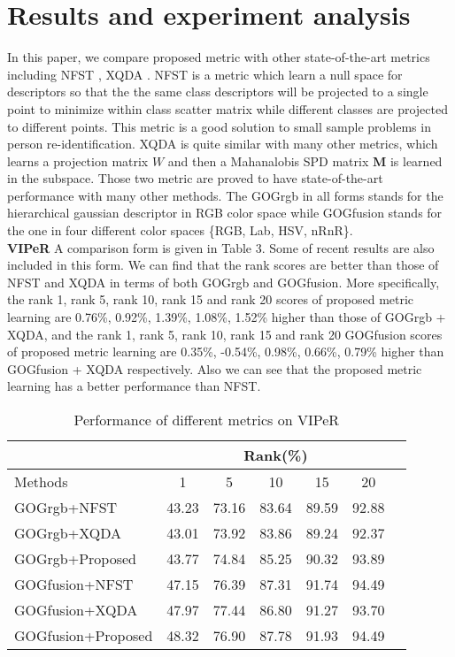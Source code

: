 \section{Results and experiment analysis}
In this paper, we compare proposed metric with other state-of-the-art metrics including NFST \cite{NFST}, XQDA \cite{LOMO}. NFST is a metric which learn a null space for descriptors so that the the same class descriptors will be projected to  
a single point to minimize within class scatter matrix while different classes are projected to different points. This metric is a good solution to small sample problems in person re-identification. XQDA is quite similar with many other metrics, which learns a projection matrix $W$ and then a Mahanalobis SPD matrix $\bm{M}$ is learned in the subspace. Those two metric are proved to have state-of-the-art performance with many other methods. The GOGrgb in all forms stands for the hierarchical gaussian descriptor in RGB color space while GOGfusion stands for the one in four different color spaces \{RGB, Lab, HSV, nRnR\}.\\
\textbf{VIPeR} A comparison form is given in Table 3. Some of recent results are also included in this form. We can find that the rank scores are better than those of NFST and XQDA in terms of both GOGrgb and GOGfusion. More specifically, the rank 1, rank 5, rank 10, rank 15 and rank 20 scores of proposed metric learning are 0.76\%, 0.92\%, 1.39\%, 1.08\%, 1.52\% higher than those of GOGrgb + XQDA, and the rank 1, rank 5, rank 10, rank 15 and rank 20 GOGfusion scores of proposed metric learning are 0.35\%, -0.54\%, 0.98\%, 0.66\%, 0.79\% higher than GOGfusion + XQDA respectively. Also we can see that the proposed metric learning has a better performance than NFST. \newline 
\begin{table}[H]
\caption{Performance of different metrics on VIPeR}
\centering
 \begin{tabular}{|l|c|c|c|c|c|c|}
\hline
& \multicolumn{5}{|c|}{Rank(\%)} \\
\hline
Methods& 1 & 5 &10& 15&20\\
\hline
GOGrgb+NFST& 43.23&73.16 &83.64 & 89.59&92.88\\  
\hline
GOGrgb+XQDA& 43.01&73.92&83.86& 89.24& 92.37\\
\hline
GOGrgb+Proposed&43.77 &74.84&85.25&90.32&93.89\\   %
\hline
GOGfusion+NFST&47.15& 76.39&87.31&91.74&94.49\\
\hline
GOGfusion+XQDA& 47.97& 77.44& 86.80& 91.27&93.70\\  
\hline
GOGfusion+Proposed&48.32&76.90&87.78&91.93&94.49\\ %

\hline

\end{tabular}
\end{table}
